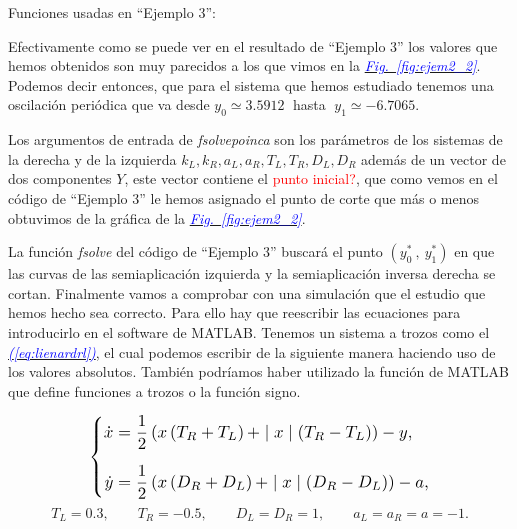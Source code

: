 \documentclass[12pt,a4paper]{report} %
\newcommand{\fref}[1]{\hyperref[#1]{\textcolor{blue}{\textit{Fig.~\ref*{#1}}}}}
\newcommand{\eref}[1]{\hyperref[#1]{\textcolor{blue}{\textit{(\ref*{#1})}}}}
\begin{document}
		
	\vspace{1cm}
	
	\vspace{1cm}
	
	\newpage
	
	\noindent Funciones usadas en ``Ejemplo 3'':
	\vspace{0.5cm}
	\vspace{0.5cm}
	
	\vspace{1cm}\noindent Efectivamente como se puede ver en el resultado de ``Ejemplo 3'' los valores que hemos obtenidos son muy parecidos a los que vimos en la \fref{fig:ejem2_2}. Podemos decir entonces, que para el sistema que hemos estudiado tenemos una oscilación periódica que va desde $y_0\simeq3.5912\;$ hasta $\; y_1\simeq-6.7065$.

	
	\vspace{0.5cm}Los argumentos de entrada de \textit{fsolvepoinca} son los parámetros de los sistemas de la derecha y de la izquierda $k_L,k_R,a_L,a_R,T_L,T_R,D_L,D_R$ además de un vector de dos componentes $Y$, este vector contiene el \textcolor{red}{punto inicial?}, que como vemos en el código de ``Ejemplo 3'' le hemos asignado el punto de corte que más o menos obtuvimos de la gráfica de la \fref{fig:ejem2_2}.
	
	
	\vspace{0.5cm}La función \textit{fsolve} del código de ``Ejemplo 3'' buscará el punto $\left(y_0^*\:,\: y_1^*\right)$ en que las curvas de las semiaplicación izquierda y la semiaplicación inversa derecha se cortan.
	\newpage
	Finalmente vamos a comprobar con una simulación que el estudio que hemos hecho sea correcto. Para ello hay que reescribir las ecuaciones para introducirlo en el software de MATLAB. Tenemos un sistema a trozos como el \eref{eq:lienardrl}, el cual podemos escribir de la siguiente manera haciendo uso de los valores absolutos. También podríamos haber utilizado la función de MATLAB que define funciones a trozos o la función signo.
	
	\begin{equation}
		\label{eq:clejem}
		\scalebox{1.2}{$\displaystyle
			\left\{
			\begin{aligned}
			\dot{x}&=\frac{1}{2}\left( x\left(T_R+T_L\right)+\mid x\mid \left(T_R-T_L\right)\right)-y,
				 \\[2mm]
			\dot{y}&=\frac{1}{2}\left( x\left(D_R+D_L\right)+\mid x\mid \left(D_R-D_L\right)\right)-a,
			\end{aligned}
			\right. 
			$}
	\end{equation}\smallskip
	\begin{equation*}
		T_L=0.3, \qquad T_R=-0.5, \qquad D_L=D_R=1, \qquad a_L=a_R=a=-1.
	\end{equation*}\smallskip
	
\end{document}
